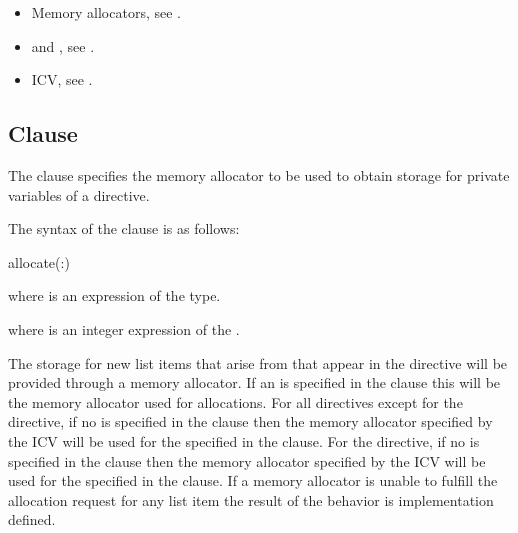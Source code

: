\crossreferences
\begin{itemize}
\item Memory allocators, see .
\item {} and , see .
\item {} ICV, see .
\end{itemize}

\subsection{ Clause}
\label{subsec:allocate Clause}
\summary
The  clause specifies the memory allocator to be used to obtain storage for private variables of a directive.

\syntax

The syntax of the  clause is as follows:

\begin{boxedcode}
allocate(\plc{[allocator}:\plc{] list})
\end{boxedcode}

\begin{ccppspecific}
where  is an expression of the  type.
\end{ccppspecific}
\begin{fortranspecific}
where  is an integer expression of the  .
\end{fortranspecific}

\descr

The storage for new list items that arise from  that appear in the directive will be provided through a memory allocator. If an  is specified in the clause this will be the memory allocator used for allocations. For all directives except for the  directive, if no  is specified in the clause then the memory allocator specified by the  ICV will be used for the  specified in the  clause. For the  directive, if no  is specified in the clause then the memory allocator specified by the  ICV will be used for the  specified in the  clause. If a memory allocator is unable to fulfill the allocation request for any list item the result of the behavior is implementation defined.

